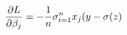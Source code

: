\documentclass[preview]{standalone}
\begin{document}
\begin{align*}
\special{dvisvgm:raw <g id='unique000'>}\frac{\partial{L}}{\partial\beta_j}=-\frac{1}{n}\sigma^n_{i=1}x_j(y-\sigma(z)\special{dvisvgm:raw </g>}
\end{align*}
\end{document}

